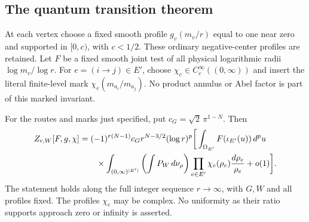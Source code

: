 \subsection{The quantum transition theorem}
At each vertex choose a fixed smooth profile $g_v(m_v/r)$ equal to
one near zero and supported in $[0,c)$, with $c<1/2$. These ordinary
negative-center profiles are retained. Let $F$ be a fixed smooth
joint test of all physical logarithmic radii $\log m_v/\log r$.
For $e=(i\to j)\in E'$, choose
$\chi_e\in C_c^\infty((0,\infty))$ and insert the literal
finite-level mark $\chi_e(m_{a_i}/m_{a_j})$. No product annulus or
Abel factor is part of this marked invariant.

\begin{theorem}
\label{thm:ratio}
For the routes and marks just specified, put
$c_G=\sqrt2\,\pi^{1-N}$. Then
\begin{align}
 Z_{r,W}[F,g,\chi]
 &=(-1)^{r(N-1)}c_G r^{N-3/2}(\log r)^p
 \bigg[
 \int_{\Omega_{E'}}F(\iota_{E'}(u))\,d^pu\notag\\
 &\qquad\times
 \int_{(0,\infty)^{|E'|}}
      \left(\int P_W\,d\nu_\rho\right)
      \prod_{e\in E'}\chi_e(\rho_e)\frac{d\rho_e}{\rho_e}
 +o(1)\bigg].\label{eq:ratio-quantum}
\end{align}
The statement holds along the full integer sequence $r\to\infty$,
with $G,W$ and all profiles fixed. The profiles $\chi_e$ may be complex.
No uniformity as their ratio supports approach zero or infinity is
asserted.
\end{theorem}

